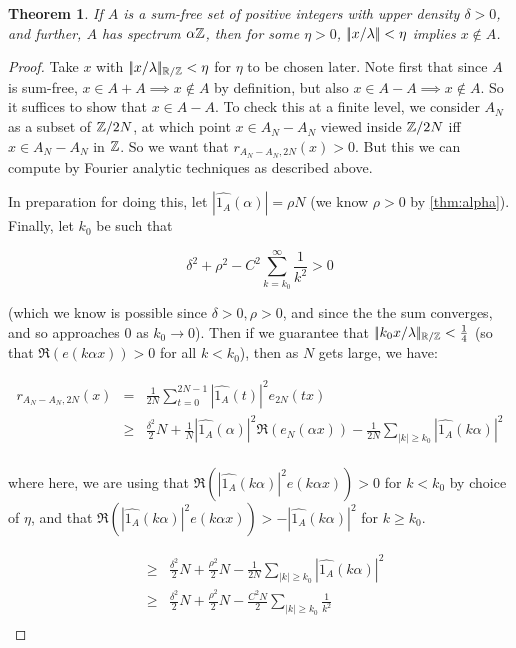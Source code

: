 \documentclass{article}
\newtheorem{theorem}{Theorem}[section]
\theoremstyle{definition}
\theoremstyle{remark}
\numberwithin{equation}{section}
\begin{document}
\begin{theorem}\label{thm:hole1}
  If $A$ is a sum-free set of positive integers with upper density
  $\delta > 0$, and further, $A$ has spectrum $\alpha\mathbb{Z}$, then for
  some $\eta > 0$, $|\!|x/\lambda|\!| < \eta$ implies $x \notin A$.
\end{theorem}

\begin{proof}
  Take $x$ with $|\!|x/\lambda|\!|_{\mathbb{R}/\mathbb{Z}} < \eta$ for $\eta$ to be chosen
  later.  Note first that since $A$ is sum-free,
  $x \in A+A \implies x \notin A$ by definition, but also
  $x \in A-A \implies x \notin A$.  So it suffices to show that
  $x \in A-A$.  To check this at a finite level, we consider $A_N$ as
  a subset of $\mathbb{Z}/2N$, at which point $x \in A_N - A_N$ viewed inside
  $\mathbb{Z}/2N$ iff $x \in A_N - A_N$ in $\mathbb{Z}$.  So we want that
  $r_{A_N-A_N,2N}(x) > 0$.  But this we can compute by Fourier
  analytic techniques as described above.

  In preparation for doing this, let
  $|\widehat{1_A}(\alpha)| = \rho N$ (we know $\rho > 0$ by
  \ref{thm:alpha}).  Finally, let $k_0$ be such that

  \[\delta^2 + \rho^2 - C^2 \sum_{k=k_0}^\infty \frac{1}{k^2} > 0\]

  (which we know is possible since $\delta > 0, \rho > 0$, and since
  the the sum converges, and so approaches 0 as $k_0 \to 0$).  Then if
  we guarantee that $|\!|k_0 x/\lambda|\!|_{\mathbb{R}/\mathbb{Z}} < \frac14$ (so that
  $\Re(e(k\alpha x)) > 0$ for all $k < k_0$), then as $N$ gets large, we
  have:

  \begin{eqnarray*}
    r_{A_N - A_N,2N}(x) &=& \frac{1}{2N} \sum_{t=0}^{2N-1} |\widehat{1_A}(t)|^2 e_{2N}(tx)\\
                        &\geq& \frac{\delta^2}{2} N + \frac{1}{N} |\widehat{1_A}(\alpha)|^2 \Re(e_N(\alpha x))
                               - \frac{1}{2N} \sum_{|k| \geq k_0}
                               |\widehat{1_A}(k\alpha)|^2\\
  \end{eqnarray*}

  where here, we are using that
  $\Re(|\widehat{1_A}(k\alpha)|^2 e(k\alpha x)) > 0$ for $k < k_0$ by
  choice of $\eta$, and that
  $\Re(|\widehat{1_A}(k\alpha)|^2 e(k\alpha x)) >
  -|\widehat{1_A}(k\alpha)|^2$ for $k \geq k_0$.

  \begin{eqnarray*}
    &\geq& \frac{\delta^2}{2} N + \frac{\rho^2}{2} N
           - \frac{1}{2N} \sum_{|k| \geq k_0} |\widehat{1_A}(k\alpha)|^2\\
    &\geq& \frac{\delta^2}{2} N + \frac{\rho^2}{2} N
           - \frac{C^2 N}{2} \sum_{|k| \geq k_0}
           \frac{1}{k^2}\\
  \end{eqnarray*}



\end{proof}
\end{document}
